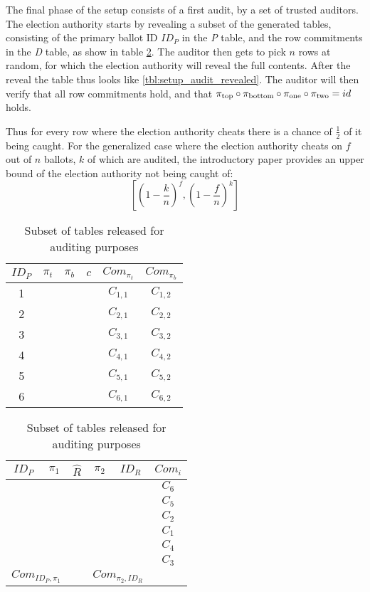 The final phase of the setup consists of a first audit, by a set of trusted
auditors. The election authority starts by revealing a subset of the generated
tables, consisting of the primary ballot ID $ID_P$ in the \emph{P} table, and
the row commitments in the \emph{D} table, as show in table
\ref{tbl:setup_audit}. The auditor then gets to pick $n$ rows at random, for
which the election authority will reveal the full contents. After the reveal
the table thus looks like \ref{tbl:setup_audit_revealed}. The auditor will then
verify that all row commitments hold, and that $\pi_{\text{top}} \circ \pi_{\text{bottom}} \circ
\pi_{\text{one}} \circ \pi_{\text{two}} = id$ holds.

Thus for every row where the election authority cheats there is a chance of
$\frac{1}{2}$ of it being caught. For the generalized case where the election
authority cheats on $f$ out of $n$ ballots, $k$ of which are audited, the
introductory paper\autocite{fisherPunchscanIntroductionSystem2006} provides an
upper bound of the election authority not being
caught of:
\[
	[(1 - \frac{k}{n})^f, (1 - \frac{f}{n})^k]
\]

\begin{table}
	\centering
	\begin{subtable}{.5\linewidth}
		\begin{tabular}{|c|c|c|c|c|c|}
			\hline
			$ID_P$ & $\pi_{t}$ & $\pi_{b}$ & $c$ & $Com_{\pi_{t}}$ & $Com_{\pi_{b}}$ \\
			\hline
			1 & & & & $C_{1, 1}$ & $C_{1, 2}$ \\
			2 & & & & $C_{2, 1}$ & $C_{2, 2}$ \\
			3 & & & & $C_{3, 1}$ & $C_{3, 2}$ \\
			4 & & & & $C_{4, 1}$ & $C_{4, 2}$ \\
			5 & & & & $C_{5, 1}$ & $C_{5, 2}$ \\
			6 & & & & $C_{6, 1}$ & $C_{6, 2}$ \\
			\hline
		\end{tabular}
	\end{subtable}%
	\begin{subtable}{.5\linewidth}
		\begin{tabular}{|c|c|c|c|c|c|}
			\hline
			$ID_P$ & $\pi_1$ & $\hat{R}$ & $\pi_2$ & $ID_R$ & $Com_{i}$ \\
			\hline
			& & & & & $C_6$ \\
			& & & & & $C_5$ \\
			& & & & & $C_2$ \\
			& & & & & $C_1$ \\
			& & & & & $C_4$ \\
			& & & & & $C_3$ \\
			\hline
			\multicolumn{2}{|c|}{$Com_{ID_P, \pi_1}$} &   & \multicolumn{2}{c|}{$Com_{\pi_2, ID_R}$} & \\
			\hline
		\end{tabular}
	\end{subtable}
	\caption{Subset of tables released for auditing purposes}
	\label{tbl:setup_audit}
\end{table}

